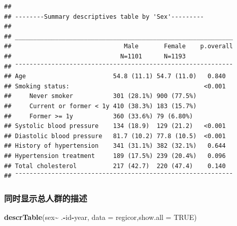 \documentclass[
]{article}
\newenvironment{Shaded}{\begin{snugshade}}{\end{snugshade}}
\newcommand{\AttributeTok}[1]{\textcolor[rgb]{0.13,0.29,0.53}{#1}}
\newcommand{\ConstantTok}[1]{\textcolor[rgb]{0.56,0.35,0.01}{#1}}
\newcommand{\FunctionTok}[1]{\textcolor[rgb]{0.13,0.29,0.53}{\textbf{#1}}}
\newcommand{\NormalTok}[1]{#1}
\newcommand{\SpecialCharTok}[1]{\textcolor[rgb]{0.81,0.36,0.00}{\textbf{#1}}}
\newcommand{\StringTok}[1]{\textcolor[rgb]{0.31,0.60,0.02}{#1}}
\begin{document}
\begin{verbatim}
## 
## --------Summary descriptives table by 'Sex'---------
## 
## ____________________________________________________________ 
##                               Male       Female    p.overall 
##                              N=1101      N=1193              
## ¯¯¯¯¯¯¯¯¯¯¯¯¯¯¯¯¯¯¯¯¯¯¯¯¯¯¯¯¯¯¯¯¯¯¯¯¯¯¯¯¯¯¯¯¯¯¯¯¯¯¯¯¯¯¯¯¯¯¯¯ 
## Age                        54.8 (11.1) 54.7 (11.0)   0.840   
## Smoking status:                                     <0.001   
##     Never smoker           301 (28.1%) 900 (77.5%)           
##     Current or former < 1y 410 (38.3%) 183 (15.7%)           
##     Former >= 1y           360 (33.6%) 79 (6.80%)            
## Systolic blood pressure    134 (18.9)  129 (21.2)   <0.001   
## Diastolic blood pressure   81.7 (10.2) 77.8 (10.5)  <0.001   
## History of hypertension    341 (31.1%) 382 (32.1%)   0.644   
## Hypertension treatment     189 (17.5%) 239 (20.4%)   0.096   
## Total cholesterol          217 (42.7)  220 (47.4)    0.140   
## ¯¯¯¯¯¯¯¯¯¯¯¯¯¯¯¯¯¯¯¯¯¯¯¯¯¯¯¯¯¯¯¯¯¯¯¯¯¯¯¯¯¯¯¯¯¯¯¯¯¯¯¯¯¯¯¯¯¯¯¯
\end{verbatim}

\subsubsection{\texorpdfstring{\textbf{同时显示总人群的描述}}{同时显示总人群的描述}}\label{ux540cux65f6ux663eux793aux603bux4ebaux7fa4ux7684ux63cfux8ff0}

\begin{Shaded}
\begin{Highlighting}[]
\FunctionTok{descrTable}\NormalTok{(}\StringTok{\textasciigrave{}}\AttributeTok{sex}\StringTok{\textasciigrave{}}\SpecialCharTok{\textasciitilde{}}\NormalTok{ .}\SpecialCharTok{{-}}\NormalTok{id}\SpecialCharTok{{-}}\NormalTok{year, }\AttributeTok{data =}\NormalTok{ regicor,}\AttributeTok{show.all =} \ConstantTok{TRUE}\NormalTok{)}
\end{Highlighting}
\end{Shaded}
\end{document}
